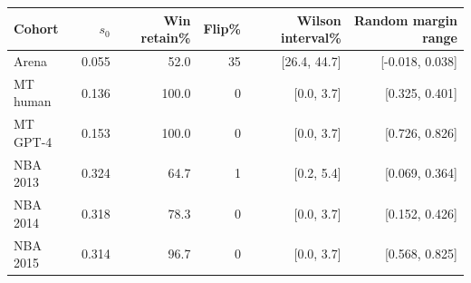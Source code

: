 \begin{tabular}{lrrrrr}
\toprule
Cohort & $s_0$ & Win retain\% & Flip\% & Wilson interval\% & Random margin range \\
\midrule
Arena & 0.055 & 52.0 & 35 & [26.4, 44.7] & [-0.018, 0.038] \\
MT human & 0.136 & 100.0 & 0 & [0.0, 3.7] & [0.325, 0.401] \\
MT GPT-4 & 0.153 & 100.0 & 0 & [0.0, 3.7] & [0.726, 0.826] \\
NBA 2013 & 0.324 & 64.7 & 1 & [0.2, 5.4] & [0.069, 0.364] \\
NBA 2014 & 0.318 & 78.3 & 0 & [0.0, 3.7] & [0.152, 0.426] \\
NBA 2015 & 0.314 & 96.7 & 0 & [0.0, 3.7] & [0.568, 0.825] \\
\bottomrule
\end{tabular}

